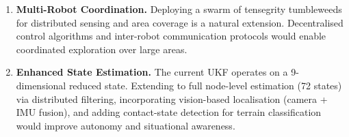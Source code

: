 \begin{enumerate}
\item \textbf{Multi-Robot Coordination.}
Deploying a swarm of tensegrity tumbleweeds for distributed sensing and
area coverage is a natural extension. Decentralised control algorithms
and inter-robot communication protocols would enable coordinated
exploration over large areas.

\item \textbf{Enhanced State Estimation.}
The current UKF operates on a 9-dimensional reduced state.
Extending to full node-level estimation (72 states) via distributed
filtering, incorporating vision-based localisation (camera + IMU
fusion), and adding contact-state detection for terrain classification
would improve autonomy and situational awareness.

\end{enumerate}
